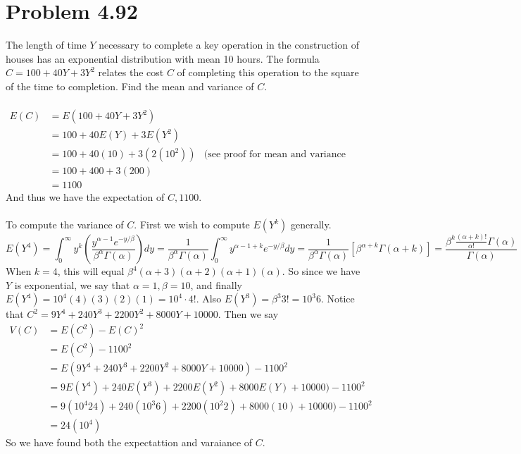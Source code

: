 \documentclass{article}
\theoremstyle{definition}
\begin{document}
\section*{Problem 4.92}
    The length of time $Y$ necessary to complete a key operation in the construction
    of houses has an exponential distribution with mean 10 hours. The formula $C = 
    100 + 40Y + 3Y^2$ relates the cost $C$ of completing this operation to the square
    of the time to completion. Find the mean and variance of $C$.\\\\
    \begin{align*}
        E(C) &= E(100 + 40Y + 3Y^2)\\
        &= 100 + 40 E(Y) + 3 E(Y^2)\\
        &= 100 + 40 (10) + 3 (2(10^2)) & \text{(see proof for mean and variance of Gamma distribution)}\\
        &= 100 + 400 + 3(200)\\
        &= 1100
    \end{align*}
    And thus we have the expectation of $C, 1100$.\\\\

    To compute the variance of $C$. First we wish to compute $E(Y^k)$ generally.
    \[
        E(Y^4) = \int_0^\infty y^k \left( \frac{y^{\alpha - 1} e ^{-y / \beta}}{\beta^\alpha \Gamma ( \alpha)}\right)dy
        = \frac{1}{\beta^\alpha \Gamma(\alpha)} \int_0^\infty y^{\alpha - 1 + k} e^{-y / \beta} dy = 
        \frac{1}{\beta^\alpha \Gamma(\alpha)}[\beta^{\alpha + k}\Gamma(\alpha + k)] = 
        \frac{\beta^k \frac{(\alpha + k)!}{\alpha !} \Gamma(\alpha)}{\Gamma(\alpha)}
    \]
    When $k = 4$, this will equal $\beta^4 (\alpha + 3)(\alpha + 2)(\alpha + 1)(\alpha)$. So since we have $Y$ is exponential,
    we say that $\alpha = 1, \beta = 10$, and finally $E(Y^4) = 10^4 (4)(3)(2)(1) = 10^4 \cdot 4!$. Also $E(Y^3) = \beta^3 3! = 10^3 6$.
    Notice that $C^2 = 9Y^4 + 240Y^3 + 2200Y^2 + 8000Y + 10000$.
    Then we say
    \begin{align*}
        V(C) &= E(C^2) - E(C)^2\\
        &=E(C^2) - 1100^2\\
        &=E(9Y^4 + 240Y^3 + 2200Y^2 + 8000Y + 10000) - 1100^2\\
        &=9E(Y^4) + 240 E(Y^3) + 2200 E(Y^2) + 8000 E(Y) + 10000) - 1100^2\\
        &=9(10^4 24) + 240 (10^3 6) + 2200 (10^2 2) + 8000 (10) + 10000) - 1100^2\\
        &=24 (10^4)
    \end{align*}
    So we have found both the expectattion and varaiance of $C$.
\end{document}
